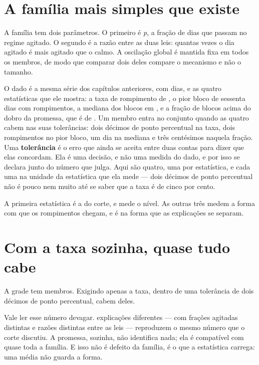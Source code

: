 \section{A família mais simples que existe}

A família tem dois parâmetros. O primeiro é \emph{p}, a fração de dias que passam no regime
agitado. O segundo é a razão entre as duas leis: quantas vezes o dia agitado é mais
agitado que o calmo. A oscilação global é mantida fixa em todos os membros, de modo que comparar
dois deles compare o mecanismo e não o tamanho.

O dado é a mesma série dos capítulos anteriores, com \numCondicionamentoDias{} dias, e as quatro
estatísticas que ele mostra: a taxa de rompimento de \numCondicionamentoTaxa, o pior bloco de
sessenta dias com \numCondicionamentoPior{} rompimentos, a mediana dos blocos em
\numCondicionamentoMediana, e a fração de blocos acima do dobro da promessa, que é de
\numCondicionamentoAcimaDoDobro. Um membro entra no conjunto quando as quatro cabem nas suas
tolerâncias: dois décimos de ponto percentual na taxa, dois rompimentos no pior bloco, um dia na
mediana e três centésimos naquela fração.
Uma \textbf{tolerância} é o erro que ainda se aceita entre duas contas para dizer que elas
concordam. Ela é uma decisão, e não uma medida do dado, e por isso se declara junto do número que julga.
Aqui são quatro, uma por estatística, e cada uma na unidade da estatística que ela mede --- dois
décimos de ponto percentual não é pouco nem muito até se saber que a taxa é de cinco por cento.

A primeira estatística é a do corte, e mede o nível. As outras três medem a forma com
que os rompimentos chegam, e é na forma que as explicações se separam.

\section{Com a taxa sozinha, quase tudo cabe}

A grade tem \numCondicionamentoCombinacoes{} membros. Exigindo apenas a taxa, dentro de uma
tolerância de dois décimos de ponto percentual, cabem \numCondicionamentoCabemTaxa{} deles.

Vale ler esse número devagar. \numCondicionamentoCabemTaxa{} explicações diferentes --- com frações agitadas
distintas e razões distintas entre as leis --- reproduzem o mesmo número que o corte discutiu. A promessa, sozinha, não identifica nada; ela é compatível com quase
toda a família. E isso não é defeito da família, é o que a estatística carrega: uma média não
guarda a forma.

